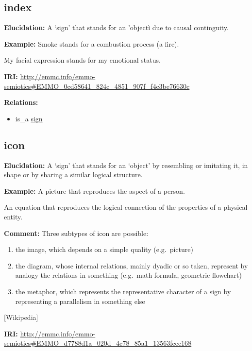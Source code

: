 \documentclass[a4paper,]{report}
\providecommand{\tightlist}{%
  \setlength{\itemsep}{0pt}\setlength{\parskip}{0pt}}
\begin{document}
\hypertarget{index}{%
\subsection{index}\label{index}}

\textbf{Elucidation:} A `sign' that stands for an 'objectì due to causal
continguity.

\textbf{Example:} Smoke stands for a combustion process (a fire).

My facial expression stands for my emotional status.

\textbf{IRI:}
\url{http://emmc.info/emmo-semiotics\#EMMO_0cd58641_824c_4851_907f_f4c3be76630c}

\textbf{Relations:}

\begin{itemize}
\tightlist
\item
  is\_a \protect\hyperlink{sign}{sign}
\end{itemize}

\hypertarget{icon}{%
\subsection{icon}\label{icon}}

\textbf{Elucidation:} A `sign' that stands for an `object' by resembling
or imitating it, in shape or by sharing a similar logical structure.

\textbf{Example:} A picture that reproduces the aspect of a person.

An equation that reproduces the logical connection of the properties of
a physical entity.

\textbf{Comment:} Three subtypes of icon are possible:

\begin{enumerate}
\def\labelenumi{(\alph{enumi})}
\item
  the image, which depends on a simple quality (e.g.~picture)
\item
  the diagram, whose internal relations, mainly dyadic or so taken,
  represent by analogy the relations in something (e.g.~math formula,
  geometric flowchart)
\item
  the metaphor, which represents the representative character of a sign
  by representing a parallelism in something else
\end{enumerate}

{[}Wikipedia{]}

\textbf{IRI:}
\url{http://emmc.info/emmo-semiotics\#EMMO_d7788d1a_020d_4c78_85a1_13563fcec168}
\end{document}
